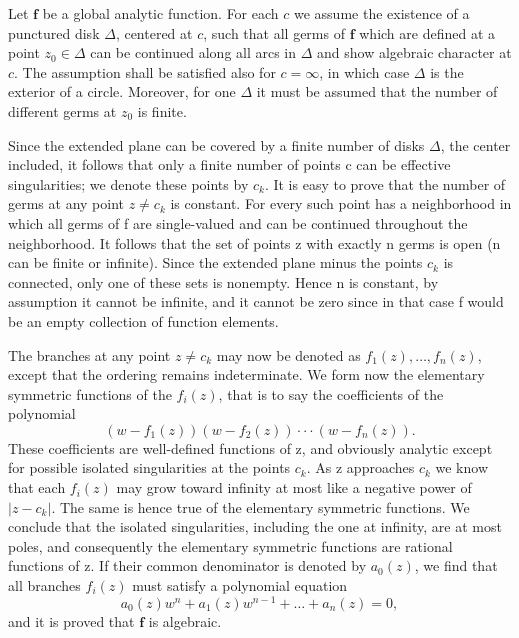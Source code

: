 Let $\mathbf{f}$ be a global analytic function. For each $c$ we assume the existence of a punctured disk $\Delta$, centered at $c$, such that all germs of $\mathbf{f}$ which are defined at a point $z_0 \in \Delta$ can be continued along all arcs in $\Delta$ and show algebraic character at $c$. The assumption shall be satisfied also for $c = \infty$, in which case $\Delta$ is the exterior of a circle. Moreover, for one $\Delta$ it must be assumed that the number of different germs at $z_0$ is finite.

Since the extended plane can be covered by a finite number of disks $\Delta$, the center included, it follows that only a finite number of points c can be effective singularities; we denote these points by $c_{k}$. It is easy to prove that the number of germs at any point $z \neq c_{k}$ is constant. For every such point has a neighborhood in which all germs of f are single-valued and can be continued throughout the neighborhood. It follows that the set of points z with exactly n germs is open (n can be finite or infinite). Since the extended plane minus the points $c_{k}$ is connected, only one of these sets is nonempty. Hence n is constant, by assumption it cannot be infinite, and it cannot be zero since in that case f would be an empty collection of function elements.

The branches at any point $z \neq c_{k}$ may now be denoted as $f_{1}(z), \ldots, f_{n}(z)$, except that the ordering remains indeterminate. We form now the elementary symmetric functions of the $f_{i}(z)$, that is to say the coefficients of the polynomial
\begin{equation*}
(w - f _ {1} (z)) (w - f _ {2} (z)) \cdot \cdot \cdot (w - f _ {n} (z)).
\end{equation*}
These coefficients are well-defined functions of z, and obviously analytic except for possible isolated singularities at the points $c_{k}$. As z approaches
$c_{k}$ we know that each $f_{i}(z)$ may grow toward infinity at most like a negative power of $|z - c_{k}|$. The same is hence true of the elementary symmetric functions. We conclude that the isolated singularities, including the one at infinity, are at most poles, and consequently the elementary symmetric functions are rational functions of z. If their common denominator is denoted by $a_{0}(z)$, we find that all branches $f_{i}(z)$ must satisfy a polynomial equation
\begin{equation*}
a _ {0} (z) w ^ {n} + a _ {1} (z) w ^ {n - 1} + \dots + a _ {n} (z) = 0,
\end{equation*}
and it is proved that $\mathbf{f}$ is algebraic.

